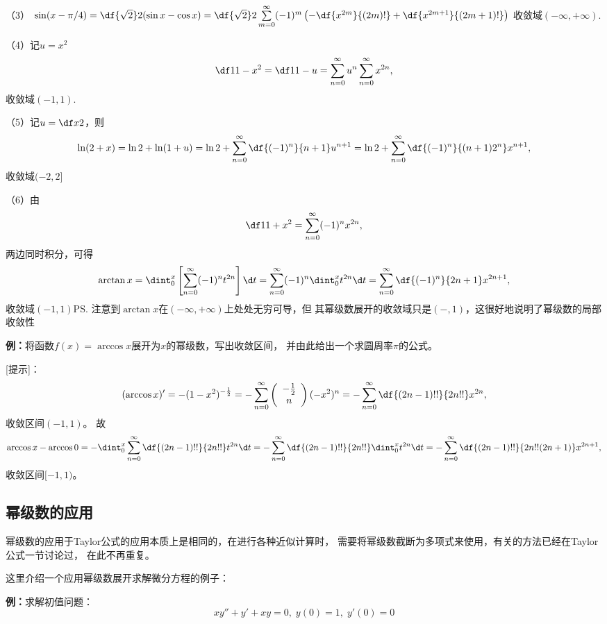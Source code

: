 （3）
$\sin(x-\pi/4)=\df{\sqrt2}2(\sin x-\cos x)
=\df{\sqrt2}2\sum\limits_{m=0}^{\infty}(-1)^m
\left(-\df{x^{2m}}{(2m)!}+\df{x^{2m+1}}{(2m+1)!}\right)$
收敛域$(-\infty,+\infty)$.

（4）记$u=x^2$
$$\df 1{1-x^2}=\df1{1-u}=\sum\limits_{n=0}^{\infty}u^n
\sum\limits_{n=0}^{\infty}x^{2n},$$
收敛域$(-1,1)$.

（5）记$u=\df x2$，则
$$\ln(2+x)=\ln2+\ln(1+u)
=\ln2+\sum\limits_{n=0}^{\infty}\df{(-1)^n}{n+1}u^{n+1}
=\ln2+\sum\limits_{n=0}^{\infty}\df{(-1)^n}{(n+1)2^n}x^{n+1},$$
收敛域$(-2,2]$

（6）由
$$\df1{1+x^2}=\sum\limits_{n=0}^{\infty}(-1)^nx^{2n},$$
两边同时积分，可得
$$\arctan x=\dint_0^x\left[\sum\limits_{n=0}^{\infty}(-1)^nt^{2n}\right]\d t
=\sum\limits_{n=0}^{\infty}(-1)^n\dint_0^xt^{2n}\d t
=\sum\limits_{n=0}^{\infty}\df{(-1)^n}{2n+1}x^{2n+1},$$
收敛域$(-1,1)$\ps{注意到$\arctan x$在$(-\infty,+\infty)$上处处无穷可导，但
其幂级数展开的收敛域只是$(-,1)$，这很好地说明了幂级数的局部收敛性}

{\bf 例：}将函数$f(x)=\arccos x$展开为$x$的幂级数，写出收敛区间，
并由此给出一个求圆周率$\pi$的公式。

[提示]：
$$(\arccos x)'=-(1-x^2)^{-\frac12}
=-\sum\limits_{n=0}^{\infty}
\left(\begin{array}{c} -\frac12 \\ n \end{array}\right)(-x^2)^n
=-\sum\limits_{n=0}^{\infty}\df{(2n-1)!!}{2n!!}x^{2n},
$$
收敛区间$(-1,1)$。
故
$$\arccos x-\arccos0
=-\dint_0^x\sum\limits_{n=0}^{\infty}\df{(2n-1)!!}{2n!!}t^{2n}\d t
=-\sum\limits_{n=0}^{\infty}\df{(2n-1)!!}{2n!!}\dint_0^xt^{2n}\d t
=-\sum\limits_{n=0}^{\infty}\df{(2n-1)!!}{2n!!(2n+1)}x^{2n+1},$$
收敛区间$[-1,1)$。

\subsection{幂级数的应用}

幂级数的应用于Taylor公式的应用本质上是相同的，在进行各种近似计算时，
需要将幂级数截断为多项式来使用，有关的方法已经在Taylor公式一节讨论过，
在此不再重复。

这里介绍一个应用幂级数展开求解微分方程的例子：

{\bf 例：}求解初值问题：$$xy''+y'+xy=0,\;y(0)=1,\;y'(0)=0$$

